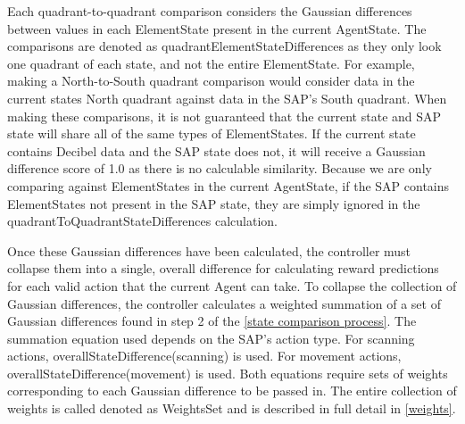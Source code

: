 Each quadrant-to-quadrant comparison considers the Gaussian differences between values in each ElementState present in the current AgentState.
The comparisons are denoted as quadrantElementStateDifferences as they only look one quadrant of each state, and not the entire ElementState.
For example, making a North-to-South quadrant comparison would consider data in the current states North quadrant against data in the SAP's South quadrant.
When making these comparisons, it is not guaranteed that the current state and SAP state will share all of the same types of ElementStates.
If the current state contains Decibel data and the SAP state does not, it will receive a Gaussian difference score of 1.0 as there is no calculable similarity.
Because we are only comparing against ElementStates in the current AgentState, if the SAP contains ElementStates not present in the SAP state, they are simply ignored in the quadrantToQuadrantStateDifferences calculation.

Once these Gaussian differences have been calculated, the controller must collapse them into a single, overall difference for calculating reward predictions for each valid action that the current Agent can take.
To collapse the collection of Gaussian differences, the controller calculates a weighted summation of a set of Gaussian differences found in step 2 of the \ref{state comparison process}.
The summation equation used depends on the SAP's action type.
For scanning actions, overallStateDifference(scanning) is used.
For movement actions, overallStateDifference(movement) is used.
Both equations require sets of weights corresponding to each Gaussian difference to be passed in.
The entire collection of weights is called denoted as WeightsSet and is described in full detail in \ref{weights}.

